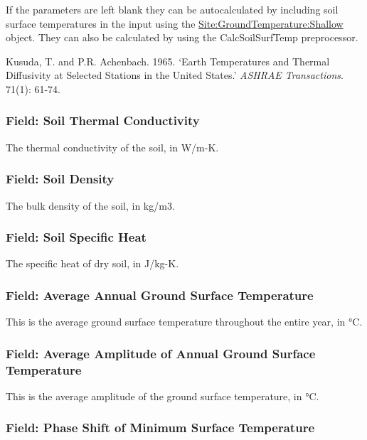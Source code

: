 If the parameters are left blank they can be autocalculated by including soil surface temperatures in the input using the \hyperref[sitegroundtemperatureshallow]{Site:GroundTemperature:Shallow} object. They can also be calculated by using the CalcSoilSurfTemp preprocessor.

Kusuda, T. and P.R. Achenbach. 1965. `Earth Temperatures and Thermal Diffusivity at Selected Stations in the United States.' \emph{ASHRAE Transactions}. 71(1): 61-74.

\subsubsection{Field: Soil Thermal Conductivity}\label{field-soil-thermal-conductivity-1}

The thermal conductivity of the soil, in W/m-K.

\subsubsection{Field: Soil Density}\label{field-soil-density-1}

The bulk density of the soil, in kg/m3.

\subsubsection{Field: Soil Specific Heat}\label{field-soil-specific-heat-1}

The specific heat of dry soil, in J/kg-K.

\subsubsection{Field: Average Annual Ground Surface Temperature}\label{field-average-annual-ground-surface-temperature}

This is the average ground surface temperature throughout the entire year, in \si{\degreeCelsius}.

\subsubsection{Field: Average Amplitude of Annual Ground Surface Temperature}\label{field-average-amplitude-of-annual-ground-surface-temperature}

This is the average amplitude of the ground surface temperature, in \si{\degreeCelsius}.

\subsubsection{Field: Phase Shift of Minimum Surface Temperature}\label{field-phase-shift-of-minimum-surface-temperature}

